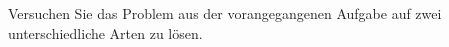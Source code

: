     \item Versuchen Sie das Problem aus der vorangegangenen Aufgabe auf zwei unterschiedliche Arten zu lösen.